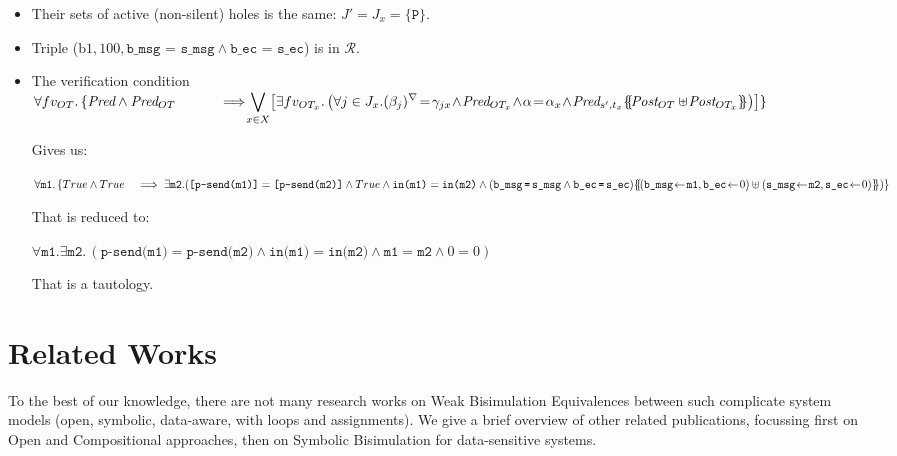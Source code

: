 \documentclass{lmcs}
\newcommand{\nounderline}[1]{#1}
\begin{document}
\begin{itemize}
  \item Their sets of active (non-silent) holes is the same: $J' = J_x = \{\texttt{P}\}$.
  \item Triple ($\text{b1},  100,  \texttt{b\_msg = s\_msg} \land \texttt{b\_ec = s\_ec}$) is in $\mathcal{R}$.
  \item The verification condition \\
    $\forall fv_{OT}.\, \{ \Pred \land \Pred_{OT}\\
\hspace{1cm} \implies\!\!\! \displaystyle{\bigvee_{x\in X}\!
   \left[\exists fv_{OT_x}.
  \left( \forall j\in J_x. \vis{\beta_j}\!=\!\gamma_{jx}\! \land\! \Pred_{OT_x}
     \!\land\! \alpha\!=\!\alpha_x\! \land\!  
     \Pred_{s',t_x}\subst{\Post_{OT}\uplus\!\Post_{OT_x}}\right)\right]\}}$

\medskip Gives us:

$\forall \texttt{m1}.\, \{True \land True\hspace{3mm} \implies
\exists \texttt{m2}. \\
(\texttt{[p-send(m1)]} = \texttt{[p-send(m2)]}
\land True
\land \nounderline{\texttt{in(m1)}} = \nounderline{\texttt{in(m2)}} \land 
\\
(\texttt{b\_msg\!\! = \!\!s\_msg} \land \texttt{b\_ec\!\! =\!\! s\_ec}) \subst{(\texttt{b\_msg}\!\gets\! \texttt{m1}, \texttt{b\_ec}\!\gets\! 0)\uplus (\texttt{s\_msg}\!\gets\! \texttt{m2},\texttt{s\_ec}\!\gets\! 0)})\}$

\medskip That is reduced to:

$\forall \texttt{m1}. \exists \texttt{m2}.\,
(\texttt{p-send(m1)} = \texttt{p-send(m2)}
\land \texttt{in(m1)} = \texttt{in(m2)}
\land \texttt{m1}=\texttt{m2} \land 0=0)$

\medskip That is a tautology.

\end{itemize}

 
      
\section{Related Works}\label{sec:RW}

 To the best of our knowledge, there are not many research works on Weak Bisimulation Equivalences between such complicate system models (open, symbolic, data-aware, with loops and assignments).
We give a brief overview of other related publications, focussing first on Open and Compositional approaches, then on Symbolic Bisimulation for data-sensitive systems.
\end{document}
